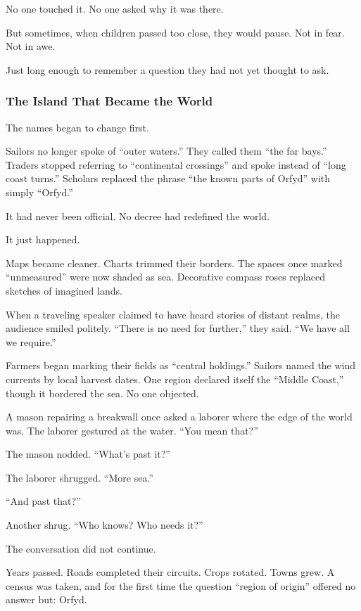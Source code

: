 \documentclass[12pt]{article}
\begin{document}
No one touched it. No one asked why it was there.

But sometimes, when children passed too close, they would pause. Not in fear. Not in awe.

Just long enough to remember a question they had not yet thought to ask.

\dotfill

\subsubsection*{The Island That Became the World}

The names began to change first.

Sailors no longer spoke of ``outer waters.'' They called them ``the far bays.'' Traders stopped referring to ``continental crossings'' and spoke instead of ``long coast turns.'' Scholars replaced the phrase ``the known parts of Orfyd'' with simply ``Orfyd.''

It had never been official. No decree had redefined the world.

It just happened.

Maps became cleaner. Charts trimmed their borders. The spaces once marked ``unmeasured'' were now shaded as sea. Decorative compass roses replaced sketches of imagined lands.

When a traveling speaker claimed to have heard stories of distant realms, the audience smiled politely. ``There is no need for further,'' they said. ``We have all we require.''

Farmers began marking their fields as ``central holdings.'' Sailors named the wind currents by local harvest dates. One region declared itself the ``Middle Coast,'' though it bordered the sea. No one objected.

A mason repairing a breakwall once asked a laborer where the edge of the world was. The laborer gestured at the water. ``You mean that?''

The mason nodded. ``What’s past it?''

The laborer shrugged. ``More sea.''

``And past that?''

Another shrug. ``Who knows? Who needs it?''

The conversation did not continue.

Years passed. Roads completed their circuits. Crops rotated. Towns grew. A census was taken, and for the first time the question ``region of origin'' offered no answer but: Orfyd.
\end{document}
